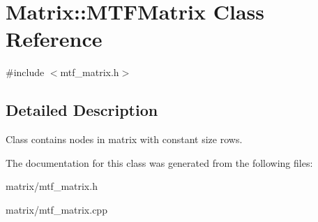 \hypertarget{classMatrix_1_1MTFMatrix}{\section{Matrix\-:\-:M\-T\-F\-Matrix Class Reference}
\label{classMatrix_1_1MTFMatrix}
}


{\ttfamily \#include $<$mtf\-\_\-matrix.\-h$>$}



\subsection{Detailed Description}
Class contains nodes in matrix with constant size rows. 

The documentation for this class was generated from the following files\-:\begin{DoxyCompactItemize}
\item 
matrix/mtf\-\_\-matrix.\-h\item 
matrix/mtf\-\_\-matrix.\-cpp\end{DoxyCompactItemize}
